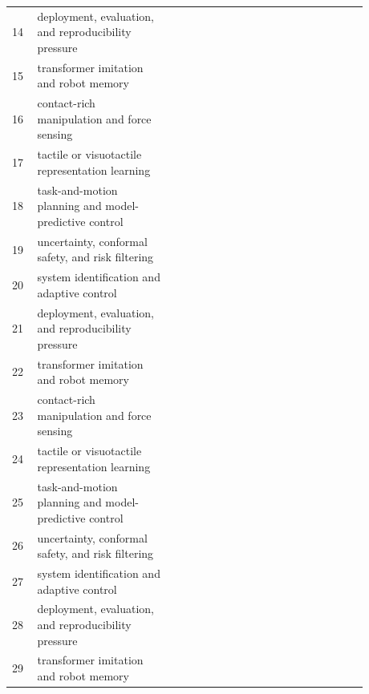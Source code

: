 \documentclass{article}
\begin{document}
\begin{longtable}{p{0.06\linewidth}p{0.34\linewidth}p{0.48\linewidth}}
14 & deployment, evaluation, and reproducibility pressure & \citep{liang2023mcuformer40,kang2023think41,ji2024sstrans42} \\
15 & transformer imitation and robot memory & \citep{queier2021emergence43,geng2021dynamic44,lin2021sceneintuitive45} \\
16 & contact-rich manipulation and force sensing & \citep{singh2022visual46,tran2025enhanced47,liu2022transformer48} \\
17 & tactile or visuotactile representation learning & \citep{fukushima2022object49,pan2026force50,wangndsavetrack51} \\
18 & task-and-motion planning and model-predictive control & \citep{zuo2026a52,salzmann2024scenegraph53,li2023transformerbased54} \\
19 & uncertainty, conformal safety, and risk filtering & \citep{suulker2024let55,chatterjee20253dsceneformer56,honda2022multitask57} \\
20 & system identification and adaptive control & \citep{huang2026robotic58,zuo2026a59,leyvavallina2024regressing60} \\
21 & deployment, evaluation, and reproducibility pressure & \citep{garcia2009survey61,elshamy2025a62,ohno2026beyond63} \\
22 & transformer imitation and robot memory & \citep{anderson2024maximizing64,frank2024a65,wozniak2023crossdomain66} \\
23 & contact-rich manipulation and force sensing & \citep{mactavish2018selective67,roy2022interaction68,gu2025artisg69} \\
24 & tactile or visuotactile representation learning & \citep{howard2017active70,wang2025visualprivileged71,belal2024multivariants72} \\
25 & task-and-motion planning and model-predictive control & \citep{bai2023surgicalvqla73,ding2026historyenhanced74,yusof2012evaluation75} \\
26 & uncertainty, conformal safety, and risk filtering & \citep{javaid2026athstnet76,liu2026histopathological77,madokoro2019indoor78} \\
27 & system identification and adaptive control & \citep{zhang2023from79,remazeilles2004robot80,hao2025a81} \\
28 & deployment, evaluation, and reproducibility pressure & \citep{li2025a82,yu2020humanrobot83,s2023development84} \\
29 & transformer imitation and robot memory & \citep{li2022graphbased85,fu2025scenellm86,garg2022semanticgeometric87} \\

\end{longtable}
\end{document}
